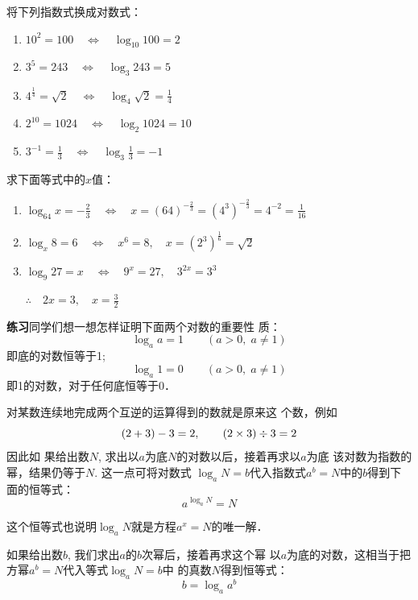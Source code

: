 \begin{example}
    将下列指数式换成对数式：
\begin{enumerate}
    \item $10^2=100\quad \Longleftrightarrow \quad \log_{10}100= 2$
    \item $3^5=243\quad \Longleftrightarrow \quad\log_3 243=5$
    \item $4^{\tfrac{1}{4}}=\sqrt{2}\quad \Longleftrightarrow \quad \log_4\sqrt{2}=\frac{1}{4}$
    \item $2^{10}=1024\quad \Longleftrightarrow \quad \log_2 1024=10$
    \item $3^{-1}=\frac{1}{3}\quad \Longleftrightarrow \quad \log_3\frac{1}{3}=-1$
\end{enumerate}
\end{example}



\begin{example}
    求下面等式中的$x$值：
\begin{enumerate}
    \item $\log_{64}x=-\frac{2}{3}  \quad \Longleftrightarrow \quad x=(64)^{-\tfrac{2}{3}}=\left(4^3\right)^{-\tfrac{2}{3}}=4^{-2}=\frac{1}{16} $
    \item  $ \log_x 8 =6 \quad \Longleftrightarrow \quad x^6=8,\quad x=(2^3)^{\tfrac{1}{6}}=\sqrt{2} $
    \item  $ \log_9 27=x \quad \Longleftrightarrow \quad 9^x=27,\quad 3^{2x}=3^3 $
    
    $\therefore\quad 2x=3,\quad x=\frac{3}{2}$
\end{enumerate}
\end{example}

\textbf{练习}\quad 同学们想一想怎样证明下面两个对数的重要性
质：
\[\log_a a=1\qquad (a>0,\; a\ne 1)\]
即底的对数恒等于1;
\[\log_a 1=0\qquad (a>0,\; a\ne 1)\]
即1的对数，对于任何底恒等于0．

对某数连续地完成两个互逆的运算得到的数就是原来这
个数，例如
$$(2+3)-3=2,\qquad (2\times3)\div 3=2$$
因此如
果给出数$N$, 求出以$a$为底$N$的对数以后，接着再求以$a$为底
该对数为指数的幂，结果仍等于$N$. 这一点可将对数式
$\log_a N=b$代入指数式$a^b=N$中的$b$得到下面的恒等式：
\begin{equation}
    a^{\log_a N}=N
\end{equation}

这个恒等式也说明$\log_a N$就是方程$a^x=N$的唯一解．

如果给出数$b$, 我们求出$a$的$b$次幂后，接着再求这个幂
以$a$为底的对数，这相当于把方幂$a^b=N$代入等式$\log_a N=b$中
的真数$N$得到恒等式：
\begin{equation}
    b=\log_a a^b
\end{equation}



